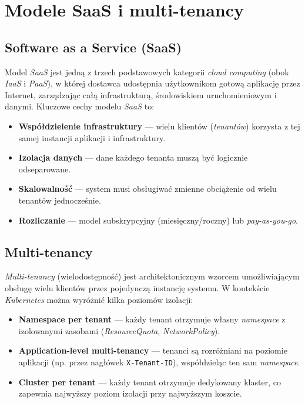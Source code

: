 \section{Modele SaaS i multi-tenancy}

\subsection{Software as a Service (SaaS)}

Model \textit{SaaS} jest jedną z trzech podstawowych kategorii \textit{cloud computing} (obok \textit{IaaS} i \textit{PaaS}), w której dostawca udostępnia użytkownikom gotową aplikację przez Internet, zarządzając całą infrastrukturą, środowiskiem uruchomieniowym i danymi. Kluczowe cechy modelu \textit{SaaS} to:

\begin{itemize}
  \item \textbf{Współdzielenie infrastruktury} — wielu klientów (\textit{tenantów}) korzysta z tej samej instancji aplikacji i infrastruktury.
  \item \textbf{Izolacja danych} — dane każdego tenanta muszą być logicznie odseparowane.
  \item \textbf{Skalowalność} — system musi obsługiwać zmienne obciążenie od wielu tenantów jednocześnie.
  \item \textbf{Rozliczanie} — model subskrypcyjny (miesięczny/roczny) lub \textit{pay-as-you-go}.
\end{itemize}

\subsection{Multi-tenancy}

\textit{Multi-tenancy} (wielodostępność) jest architektonicznym wzorcem umożliwiającym obsługę wielu klientów przez pojedynczą instancję systemu. W kontekście \textit{Kubernetes} można wyróżnić kilka poziomów izolacji:

\begin{itemize}
  \item \textbf{Namespace per tenant} — każdy tenant otrzymuje własny \textit{namespace} z izolowanymi zasobami (\textit{ResourceQuota}, \textit{NetworkPolicy}).
  \item \textbf{Application-level multi-tenancy} — tenanci są rozróżniani na poziomie aplikacji (np. przez nagłówek \texttt{X-Tenant-ID}), współdzieląc ten sam \textit{namespace}.
  \item \textbf{Cluster per tenant} — każdy tenant otrzymuje dedykowany klaster, co zapewnia najwyższy poziom izolacji przy najwyższym koszcie.
\end{itemize}

